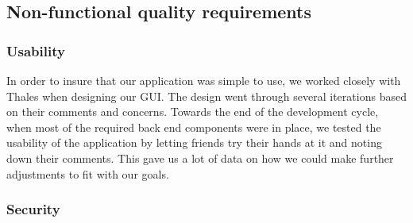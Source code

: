\subsection{Non-functional quality requirements}

\subsubsection{Usability}
In order to insure that our application was simple to use, we worked closely with Thales when designing our GUI. The design went through several iterations based on their comments and concerns. Towards the end of the development cycle, when most of the required back end components were in place, we tested the usability of the application by letting friends try their hands at it and noting down their comments. This gave us a lot of data on how we could make further adjustments to fit with our goals.

\newpage

\subsubsection{Security}

